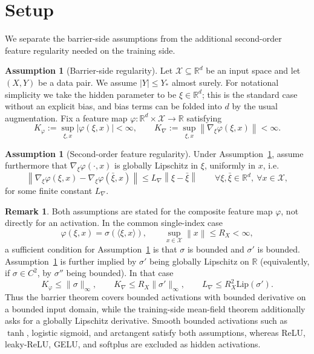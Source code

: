 \documentclass[11pt]{article}
\theoremstyle{definition}
\newtheorem{assumption}[theorem]{Assumption}
\newtheorem{remark}[theorem]{Remark}
\newcommand{\R}{\mathbb{R}}
\newcommand{\norm}[1]{\left\lVert #1 \right\rVert}
\newcommand{\mc}[1]{\mathcal{#1}}
\begin{document}
\section{Setup}

We separate the barrier-side assumptions from the additional second-order
feature regularity needed on the training side.

\begin{assumption}[Barrier-side regularity]
\label{ass:barrier-k1}
Let $\mc{X}\subseteq\R^d$ be an input space and let $(X,Y)$ be a data pair. We
assume $|Y|\le Y_\ast$ almost surely. For notational simplicity we take the
hidden parameter to be $\xi\in\R^d$; this is the standard case without an
explicit bias, and bias terms can be folded into $d$ by the usual augmentation.
Fix a feature map $\varphi:\R^d\times\mc{X}\to\R$ satisfying
\[
  K_\varphi:=\sup_{\xi,x}|\varphi(\xi,x)|<\infty,
  \qquad
  K_{\nabla}:=\sup_{\xi,x}\norm{\nabla_\xi \varphi(\xi,x)}<\infty.
\]
\end{assumption}

\begin{assumption}[Second-order feature regularity]
\label{ass:feature-second-k1}
Under Assumption~\ref{ass:barrier-k1}, assume furthermore that
$\nabla_\xi\varphi(\cdot,x)$ is globally Lipschitz in $\xi$, uniformly in $x$,
i.e.
\[
  \norm{\nabla_\xi\varphi(\xi,x)-\nabla_\xi\varphi(\bar\xi,x)}
  \le
  L_{\nabla}\norm{\xi-\bar\xi}
  \qquad
  \forall \xi,\bar\xi\in\R^d,\ \forall x\in\mc{X},
\]
for some finite constant $L_{\nabla}$.
\end{assumption}

\begin{remark}
Both assumptions are stated for the composite feature map $\varphi$, not
directly for an activation. In the common single-index case
\[
  \varphi(\xi,x)=\sigma(\langle\xi,x\rangle),
  \qquad
  \sup_{x\in\mc{X}}\norm{x}\le R_X<\infty,
\]
a sufficient condition for Assumption~\ref{ass:barrier-k1} is that $\sigma$ is
bounded and $\sigma'$ is bounded. Assumption~\ref{ass:feature-second-k1} is
further implied by $\sigma'$ being globally Lipschitz on $\R$ (equivalently, if
$\sigma\in C^2$, by $\sigma''$ being bounded). In that case
\[
  K_\varphi\le \|\sigma\|_\infty,
  \qquad
  K_{\nabla}\le R_X\|\sigma'\|_\infty,
  \qquad
  L_{\nabla}\le R_X^2\mathrm{Lip}(\sigma').
\]
Thus the barrier theorem covers bounded activations with bounded derivative on a
bounded input domain, while the training-side mean-field theorem additionally
asks for a globally Lipschitz derivative. Smooth bounded activations such as
$\tanh$, logistic sigmoid, and arctangent satisfy both assumptions, whereas
ReLU, leaky-ReLU, GELU, and softplus are excluded as hidden activations.
\end{remark}
\end{document}
